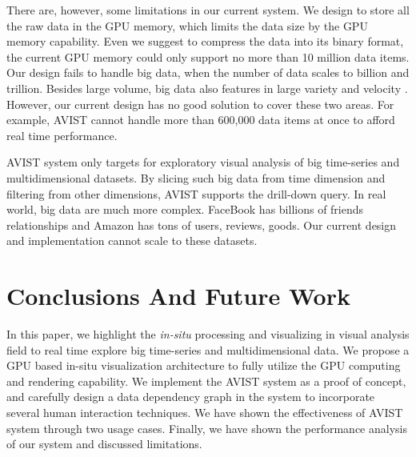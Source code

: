 \documentclass[journal]{vgtc}                %
\begin{document}
{There are, however, some limitations in our current system. We design to store all the raw data in the GPU memory, which limits the data size by the GPU memory capability. Even we suggest to compress the data into its binary format, the current GPU memory could only support no more than 10 million data items. Our design fails to handle big data, when the number of data scales to billion and trillion. Besides large volume, big data also features in large variety and velocity \cite{schroeck2012analytics}. However, our current design has no good solution to cover these two areas. For example, AVIST cannot handle more than 600,000 data items at once to afford real time performance.

AVIST system only targets for exploratory visual analysis of big time-series and multidimensional datasets. By slicing such big data from time dimension and filtering from other dimensions, AVIST supports the drill-down query. In real world, big data are much more complex. FaceBook has billions of friends relationships and Amazon has tons of users, reviews, goods. Our current design and implementation cannot scale to these datasets.   

 
 


\section{Conclusions And Future Work}
In this paper, we highlight the \emph{in-situ} processing and visualizing in visual analysis field to real time explore big time-series and multidimensional data. We propose a GPU based in-situ visualization architecture to fully utilize the GPU computing and rendering capability. We implement the AVIST system as a proof of concept, and carefully design a data dependency graph in the system to incorporate several human interaction techniques. We have shown the effectiveness of AVIST system through two usage cases. Finally, we have shown the performance analysis of our system and discussed limitations.  

}
\end{document}
